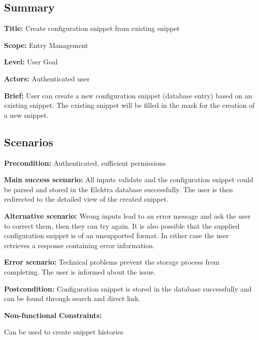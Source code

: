 \subsection*{Summary}


\begin{DoxyItemize}
\item {\bfseries Title\+:} Create configuration snippet from existing snippet
\item {\bfseries Scope\+:} Entry Management
\item {\bfseries Level\+:} User Goal
\item {\bfseries Actors\+:} Authenticated user
\item {\bfseries Brief\+:} User can create a new configuration snippet (database entry) based on an existing snippet. The existing snippet will be filled in the mask for the creation of a new snippet.
\end{DoxyItemize}

\subsection*{Scenarios}


\begin{DoxyItemize}
\item {\bfseries Precondition\+:} Authenticated, sufficient permissions
\item {\bfseries Main success scenario\+:} All inputs validate and the configuration snippet could be parsed and stored in the Elektra database successfully. The user is then redirected to the detailed view of the created snippet.
\item {\bfseries Alternative scenario\+:} Wrong inputs lead to an error message and ask the user to correct them, then they can try again. It is also possible that the supplied configuration snippet is of an unsupported format. In either case the user retrieves a response containing error information.
\item {\bfseries Error scenario\+:} Technical problems prevent the storage process from completing. The user is informed about the issue.
\item {\bfseries Postcondition\+:} Configuration snippet is stored in the database successfully and can be found through search and direct link.
\item {\bfseries Non-\/functional Constraints\+:}
\begin{DoxyItemize}
\item Can be used to create snippet histories 
\end{DoxyItemize}
\end{DoxyItemize}